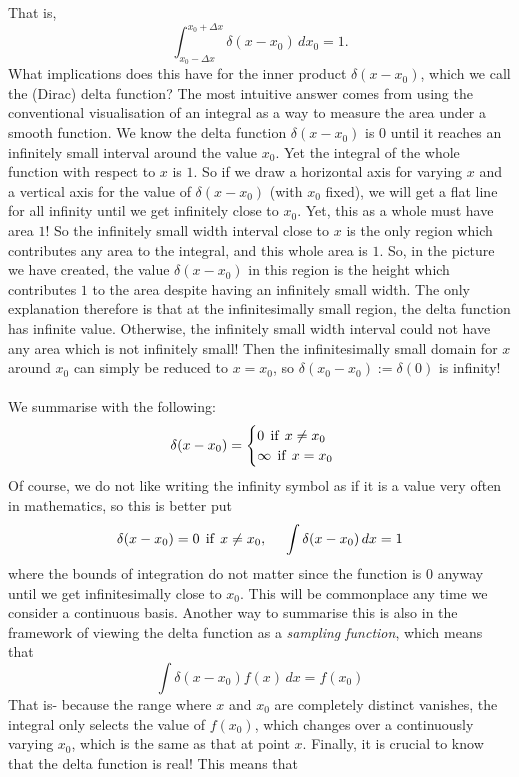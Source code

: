 That is, 
$$
\int_{x_{0}-\Delta x}^{x_{0}+\Delta x}\delta(x-x_{0})\,dx_{0}=1.
$$
What implications does this have for the inner product $\delta(x-x_{0})$, which we call the (Dirac) delta function? The most intuitive answer comes from using the conventional visualisation of an integral as a way to measure the area under a smooth function. We know the delta function $\delta(x-x_{0})$ is $0$ until it reaches an infinitely small interval around the value $x_{0}$. Yet the integral of the whole function with respect to $x$ is $1$. So if we draw a horizontal axis for varying $x$ and a vertical axis for the value of $\delta(x-x_{0})$ (with $x_{0}$ fixed), we will get a flat line for all infinity until we get infinitely close to $x_{0}$. Yet, this as a whole must have area $1$! So the infinitely small width interval close to $x$ is the only region which contributes any area to the integral, and this whole area is $1$. So, in the picture we have created, the value $\delta(x-x_{0})$ in this region is the height which contributes $1$ to the area despite having an infinitely small width. The only explanation therefore is that at the infinitesimally small region, the delta function has infinite value. Otherwise, the infinitely small width interval could not have any area which is not infinitely small! Then the infinitesimally small domain for $x$ around $x_{0}$ can simply be reduced to $x=x_{0}$, so $\delta(x_{0}-x_{0}):=\delta(0)$ is infinity!
\\\\
We summarise with the following:
$$
\delta(x-x_{0})=
\begin{cases}
0\:\:\text{if}\:\: x\neq x_{0}\\
\infty\:\:\text{if}\:\: x=x_{0}\\
\end{cases}
$$
Of course, we do not like writing the infinity symbol as if it is a value very often in mathematics, so this is better put
$$
$$
$$
\delta(x-x_{0})=
0\:\:\text{if}\:\: x\neq x_{0}, \:\:\:\:\:\:
\int\delta(x-x_{0})\,dx=1
$$
where the bounds of integration do not matter since the function is $0$ anyway until we get infinitesimally close to $x_{0}$. This will be commonplace any time we consider a continuous basis. Another way to summarise this is also in the framework of viewing the delta function as a \textit{sampling function}, which means that 
$$
\int\delta(x-x_{0})f(x)\,dx=f(x_{0})
$$
That is- because the range where $x$ and $x_{0}$ are completely distinct vanishes, the integral only selects the value of $f(x_{0})$, which changes over a continuously varying $x_{0}$, which is the same as that at point $x$. Finally, it is crucial to know that the delta function is real! This means that
